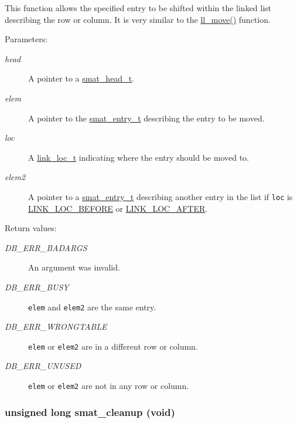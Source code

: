 This function allows the specified entry to be shifted within the linked list describing the row or column. It is very similar to the \hyperlink{group__dbprim__link_a7}{ll\_\-move()} function.\begin{Desc}
\item[Parameters: ]\par
\begin{description}
\item[{\em 
head}]A pointer to a \hyperlink{group__dbprim__smat_a1}{smat\_\-head\_\-t}. \item[{\em 
elem}]A pointer to the \hyperlink{group__dbprim__smat_a2}{smat\_\-entry\_\-t} describing the entry to be moved. \item[{\em 
loc}]A \hyperlink{group__dbprim__link_a4}{link\_\-loc\_\-t} indicating where the entry should be moved to. \item[{\em 
elem2}]A pointer to a \hyperlink{group__dbprim__smat_a2}{smat\_\-entry\_\-t} describing another entry in the list if {\tt loc} is \hyperlink{group__dbprim__link_a26a134}{LINK\_\-LOC\_\-BEFORE} or \hyperlink{group__dbprim__link_a26a135}{LINK\_\-LOC\_\-AFTER}.\end{description}
\end{Desc}
\begin{Desc}
\item[Return values: ]\par
\begin{description}
\item[{\em 
DB\_\-ERR\_\-BADARGS}]An argument was invalid. \item[{\em 
DB\_\-ERR\_\-BUSY}]{\tt elem} and {\tt elem2} are the same entry. \item[{\em 
DB\_\-ERR\_\-WRONGTABLE}]{\tt elem} or {\tt elem2} are in a different row or column. \item[{\em 
DB\_\-ERR\_\-UNUSED}]{\tt elem} or {\tt elem2} are not in any row or column. \end{description}
\end{Desc}
\hypertarget{group__dbprim__smat_a7}{
\subsubsection[smat\_\-cleanup]{\setlength{\rightskip}{0pt plus 5cm}unsigned long smat\_\-cleanup (void)}}
\label{group__dbprim__smat_a7}


